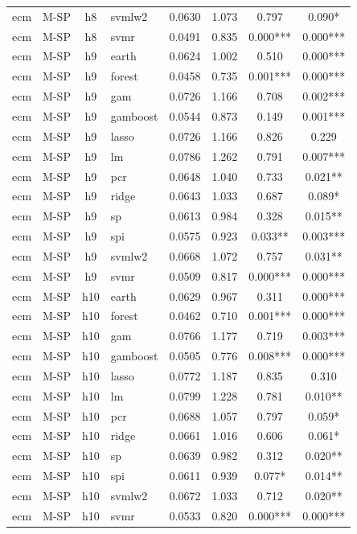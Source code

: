 \begin{ThreePartTable}
\begin{longtable}[t]{llclcccc}
ecm & M-SP & h8 & svmlw2 & 0.0630 & 1.073 & 0.797 & 0.090*\\
ecm & M-SP & h8 & svmr & 0.0491 & 0.835 & 0.000*** & 0.000***\\
\addlinespace
ecm & M-SP & h9 & earth & 0.0624 & 1.002 & 0.510 & 0.000***\\
ecm & M-SP & h9 & forest & 0.0458 & 0.735 & 0.001*** & 0.000***\\
ecm & M-SP & h9 & gam & 0.0726 & 1.166 & 0.708 & 0.002***\\
ecm & M-SP & h9 & gamboost & 0.0544 & 0.873 & 0.149 & 0.001***\\
ecm & M-SP & h9 & lasso & 0.0726 & 1.166 & 0.826 & 0.229\\
ecm & M-SP & h9 & lm & 0.0786 & 1.262 & 0.791 & 0.007***\\
ecm & M-SP & h9 & pcr & 0.0648 & 1.040 & 0.733 & 0.021**\\
ecm & M-SP & h9 & ridge & 0.0643 & 1.033 & 0.687 & 0.089*\\
ecm & M-SP & h9 & sp & 0.0613 & 0.984 & 0.328 & 0.015**\\
ecm & M-SP & h9 & spi & 0.0575 & 0.923 & 0.033** & 0.003***\\
ecm & M-SP & h9 & svmlw2 & 0.0668 & 1.072 & 0.757 & 0.031**\\
ecm & M-SP & h9 & svmr & 0.0509 & 0.817 & 0.000*** & 0.000***\\
\addlinespace
ecm & M-SP & h10 & earth & 0.0629 & 0.967 & 0.311 & 0.000***\\
ecm & M-SP & h10 & forest & 0.0462 & 0.710 & 0.001*** & 0.000***\\
ecm & M-SP & h10 & gam & 0.0766 & 1.177 & 0.719 & 0.003***\\
ecm & M-SP & h10 & gamboost & 0.0505 & 0.776 & 0.008*** & 0.000***\\
ecm & M-SP & h10 & lasso & 0.0772 & 1.187 & 0.835 & 0.310\\
ecm & M-SP & h10 & lm & 0.0799 & 1.228 & 0.781 & 0.010**\\
ecm & M-SP & h10 & pcr & 0.0688 & 1.057 & 0.797 & 0.059*\\
ecm & M-SP & h10 & ridge & 0.0661 & 1.016 & 0.606 & 0.061*\\
ecm & M-SP & h10 & sp & 0.0639 & 0.982 & 0.312 & 0.020**\\
ecm & M-SP & h10 & spi & 0.0611 & 0.939 & 0.077* & 0.014**\\
ecm & M-SP & h10 & svmlw2 & 0.0672 & 1.033 & 0.712 & 0.020**\\
ecm & M-SP & h10 & svmr & 0.0533 & 0.820 & 0.000*** & 0.000***\\

\end{longtable}
\end{ThreePartTable}
